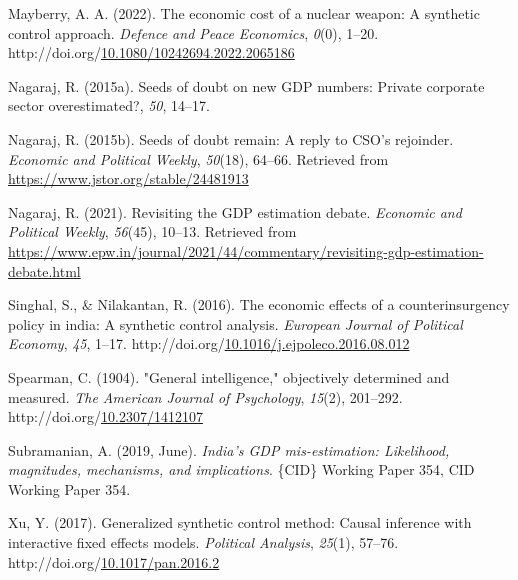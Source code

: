 \documentclass[12pt,nobind, a4paper]{reedthesis}
\newlength{\cslhangindent}
\newenvironment{CSLReferences}[2] %
{%
	\setlength{\parindent}{0pt}
	\ifodd #1 \everypar{\setlength{\hangindent}{\cslhangindent}}\ignorespaces\fi
	\ifnum #2 > 0
	\setlength{\parskip}{#2\baselineskip}
	\fi
}%
{}
\begin{document}
\begin{CSLReferences}{1}{0}
 \leavevmode{}%
 Mayberry, A. A. (2022). The economic cost of a nuclear weapon: A synthetic control approach. \emph{Defence and Peace Economics}, \emph{0}(0), 1--20. http://doi.org/\href{https://doi.org/10.1080/10242694.2022.2065186}{10.1080/10242694.2022.2065186}

 \leavevmode{}%
 Nagaraj, R. (2015a). Seeds of doubt on new {GDP} numbers: Private corporate sector overestimated?, \emph{50}, 14--17.

 \leavevmode{}%
 Nagaraj, R. (2015b). Seeds of doubt remain: A reply to {CSO}'s rejoinder. \emph{Economic and Political Weekly}, \emph{50}(18), 64--66. Retrieved from \url{https://www.jstor.org/stable/24481913}

 \leavevmode{}%
 Nagaraj, R. (2021). Revisiting the {GDP} estimation debate. \emph{Economic and Political Weekly}, \emph{56}(45), 10--13. Retrieved from \url{https://www.epw.in/journal/2021/44/commentary/revisiting-gdp-estimation-debate.html}

 \leavevmode{}%
 Singhal, S., \& Nilakantan, R. (2016). The economic effects of a counterinsurgency policy in india: A synthetic control analysis. \emph{European Journal of Political Economy}, \emph{45}, 1--17. http://doi.org/\href{https://doi.org/10.1016/j.ejpoleco.2016.08.012}{10.1016/j.ejpoleco.2016.08.012}

 \leavevmode{}%
 Spearman, C. (1904). "General intelligence," objectively determined and measured. \emph{The American Journal of Psychology}, \emph{15}(2), 201--292. http://doi.org/\href{https://doi.org/10.2307/1412107}{10.2307/1412107}

 \leavevmode{}%
 Subramanian, A. (2019, June). \emph{India's {GDP} mis-estimation: Likelihood, magnitudes, mechanisms, and implications}. \{CID\} Working Paper 354, {CID} Working Paper 354.

 \leavevmode{}%
 Xu, Y. (2017). Generalized synthetic control method: Causal inference with interactive fixed effects models. \emph{Political Analysis}, \emph{25}(1), 57--76. http://doi.org/\href{https://doi.org/10.1017/pan.2016.2}{10.1017/pan.2016.2}

 \end{CSLReferences}
	
	
\end{document}
